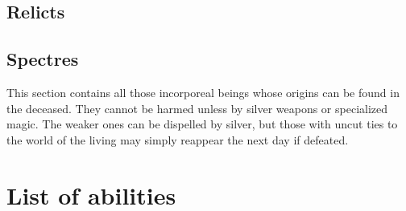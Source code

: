 \documentclass[parskip=full,11pt,%
footheight=38pt]{scrreport}
\begin{document}

\section{Relicts}


\section{Spectres}\label{monster:spectre}
This section contains all those incorporeal beings whose origins can be found in the deceased. They cannot be
harmed unless by silver weapons or specialized magic. The weaker ones can be dispelled by silver, but those
with uncut ties to the world of the living may simply reappear the next day if defeated.


\chapter{List of abilities}

\abilitylist
\end{document}
